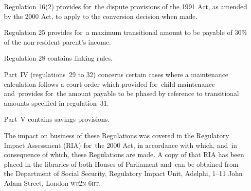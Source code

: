 \documentclass[12pt,a4paper]{article}
\begin{document}
Regulation 16(2) provides for~the dispute provisions of the 1991 Act, as amended by the 2000 Act, to apply to the conversion decision when made.

Regulation 25 provides for~a maximum transitional amount to be payable of 30\% of the non-resident parent’s income.

Regulation 28 contains linking rules.

Part~IV (regulations~29 to 32) concerns certain cases where a maintenance calculation follows a court order which provided for~child maintenance and~provides for~the amount payable to be phased by reference to transitional amounts specified in regulation~31.

Part~V contains savings provisions.

The impact on business of these Regulations was covered in the Regulatory Impact Assessment (RIA) for~the 2000 Act, in accordance with which, and~in consequence of which, these Regulations are made. A copy of that RIA has been placed in the libraries of both Houses of Parliament and~can be obtained from the Department of Social Security, Regulatory Impact Unit, Adelphi, 1--11 John Adam Street, London \textsc{\lowercase{WC2N 6HT}}. 
\end{document}
